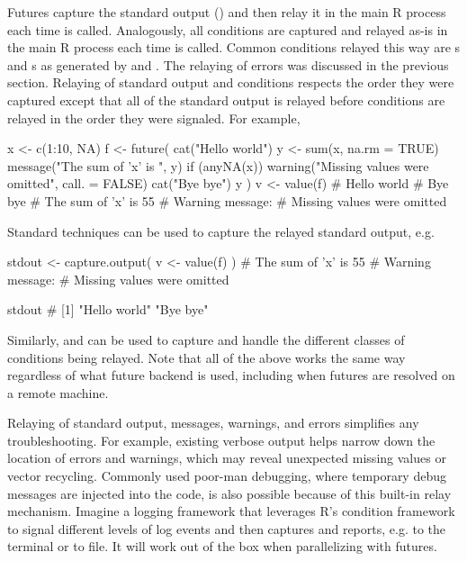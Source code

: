 Futures capture the standard output () and then relay it
in the main R process each time  is called. Analogously,
all conditions are captured and relayed as-is in the main R process
each time  is called. Common conditions relayed this way
are s and s as generated by 
and .  The relaying of errors was discussed in the
previous section.  Relaying of standard output and conditions respects
the order they were captured except that all of the standard output is
relayed before conditions are relayed in the order they were
signaled. For example,
%
\begin{example}
x <- c(1:10, NA)
f <- future({
  cat("Hello world\n")
  y <- sum(x, na.rm = TRUE)
  message("The sum of 'x' is ", y)
  if (anyNA(x)) warning("Missing values were omitted", call. = FALSE)
  cat("Bye bye\n")
  y
})
v <- value(f)
# Hello world
# Bye bye
# The sum of 'x' is 55
# Warning message:
# Missing values were omitted
\end{example}
%
Standard techniques can be used to capture the relayed standard
output, e.g.
\begin{example}
stdout <- capture.output({
  v <- value(f)
})
# The sum of 'x' is 55
# Warning message:
# Missing values were omitted

stdout
# [1] "Hello world" "Bye bye"
\end{example}
%
Similarly, 
and  can be used to capture and handle
the different classes of conditions being relayed.  Note that all of
the above works the same way regardless of what future backend is
used, including when futures are resolved on a remote machine.

Relaying of standard output, messages, warnings, and errors simplifies
any troubleshooting. For example, existing verbose output helps narrow
down the location of errors and warnings, which may reveal unexpected
missing values or vector recycling. Commonly used poor-man debugging,
where temporary debug messages are injected into the code, is also
possible because of this built-in relay mechanism.  Imagine a logging
framework that leverages R's condition framework to signal different
levels of log events and then captures and reports, e.g. to the
terminal or to file.  It will work out of the box when parallelizing
with futures.

